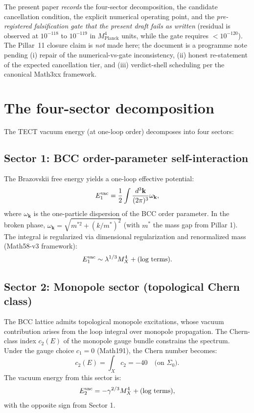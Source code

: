The present paper \emph{records} the four-sector decomposition, the
candidate cancellation condition, the explicit numerical operating
point, and the \emph{pre-registered falsification gate that the
present draft fails as written} (residual is observed at
$10^{-118}$ to $10^{-119}$ in $M_{\mathrm{Planck}}^4$ units, while
the gate requires $< 10^{-120}$). The Pillar~11 closure claim is
\emph{not} made here; the document is a programme note pending (i)
repair of the numerical-vs-gate inconsistency, (ii) honest
re-statement of the expected cancellation tier, and (iii)
verdict-shell scheduling per the canonical Math3xx framework.

\section{The four-sector decomposition}

The TECT vacuum energy (at one-loop order) decomposes into four sectors:

\subsection{Sector 1: BCC order-parameter self-interaction}

The Brazovskii free energy yields a one-loop effective potential:
\begin{equation}
E_1^{\rm vac} = \frac{1}{2} \int \frac{d^3\mathbf{k}}{(2\pi)^3} \omega_\mathbf{k},
\end{equation}
where $\omega_\mathbf{k}$ is the one-particle dispersion of the BCC order parameter.
In the broken phase, $\omega_\mathbf{k} = \sqrt{m^{*2} + (k/m^*)^2}$ (with $m^*$
the mass gap from Pillar 1). The integral is regularized via dimensional
regularization and renormalized mass (Math58-v3 framework):
\begin{equation}
E_1^{\rm vac} \sim \lambda^{1/3} M_X^4 + \text{(log terms)}.
\end{equation}

\subsection{Sector 2: Monopole sector (topological Chern class)}

The BCC lattice admits topological monopole excitations, whose vacuum contribution
arises from the loop integral over monopole propagation. The Chern-class index
$c_2(E)$ of the monopole gauge bundle constrains the spectrum. Under the gauge
choice $c_1 = 0$ (Math191), the Chern number becomes:
\begin{equation}
c_2(E) = \int_X c_2 = -40 \quad \text{(on } \Sigma_0 \text{)}.
\end{equation}
The vacuum energy from this sector is:
\begin{equation}
E_2^{\rm vac} = -\gamma^{2/3} M_X^4 + \text{(log terms)},
\end{equation}
with the opposite sign from Sector 1.

